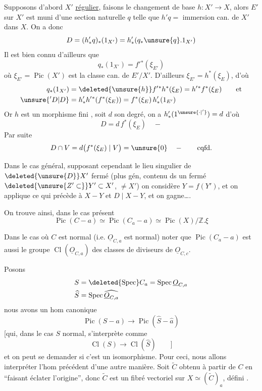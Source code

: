 Supposons d'abord $X'$ \uline{régulier}, faisons le changement de base $h:X'\longrightarrow X$, alors $E'$ sur $X'$ est muni d'une section naturelle $q$ telle que $h'q=$ immersion can. de $X'$ dans $X$. On a donc \inserted{(raisonnant sur Pic\ldots]}
\[
D=(h'_{*}q)_*(1_{X'})=h'_*(q_*{\unsure{q}}.1_{X'})
\]
Il est bien connu d'ailleurs que
\[
q_*(1_{X'})=f'{}^*(\xi_{E'})
\]
où $\xi_{E'}=\operatorname{Pic}(X')$ est la classe can. de $E'/X'$. D'ailleurs $\xi_{E'}=h^*(\xi_E)$, d'où
\[
\begin{aligned}
q_*(1_{X'})&=\deleted{\unsure{h}}f'{}^*h^*(\xi_E)=h'{}^*f^*(\xi_E)\qquad\text{et}\\
\unsure{{}'D|D}&=h'_*h'{}^*(f^*(\xi_E))=f^*(\xi_E)\,h'_*(1_{E'})
\end{aligned}
\]
Or $h$ est un morphisme fini , soit $d$ son  degré, on a $h'_*(1^{\unsure{\cdot|'}})=d$ d'où
\[
D=d\,f^*(\xi_E)\quad -
\]
Par suite
\[
D\cap V=d\bigl(f^*(\xi_E)\mid V\bigr)=\unsure{0}\quad-\qquad\text{cqfd.}
\]

Dans le cas général, supposant cependant le lieu singulier de $\deleted{\unsure{D}}X'$ fermé (plus gén, contenu ds un  fermé $\deleted{\unsure{Z'\subset}}Y'\subset X'$, $\ne X'$) on considère $Y=f(Y')$, et on applique ce qui précède à $X-Y$ et $D\mid X-Y$, et on gagne\ldots.

On trouve ainsi, dans le cas présent
\[
\boxed{\operatorname{Pic}(C-a)\simeq\operatorname{Pic}(C_a-a)\simeq\operatorname{Pic}(X)/\mathbb Z.\xi}
\]

Dans le cas où $C$ est normal (i.e.  $\underline O_{C,a}$ est normal) noter que $\operatorname{Pic}(C_a-a)$ est aussi le groupe $\operatorname{Cl}(\underline O_{C,a})$ des classes
de diviseurs de $\underline O_{C,c}$.

Posons
\[
\begin{aligned}
S&=\deleted{\operatorname{Spec}}C_a=\operatorname{Spec}\underline O_{C,a}\\
\widehat S&=\operatorname{Spec}\widehat{\underline O_{C,a}}
\end{aligned}
\]
nous avons un hom canonique
\[
\operatorname{Pic}(S-a)\longrightarrow\operatorname{Pic}(\widehat S-\hat a)
\]
[qui, dans le cas $S$ normal, s'interprète comme
\[
\operatorname{Cl}(S)\longrightarrow\operatorname{Cl}(\widehat S)\qquad ]
\]
et on peut se demander si c'est un isomorphisme.  Pour ceci, nous allons interpréter l'hom précédent d'une autre manière. Soit $\widetilde C$ obtenu à partir de $C$ en ``faisant éclater l'origine'', donc $\widetilde C$ est un fibré vectoriel sur $X\simeq(\widetilde C)_a$, défini  .

